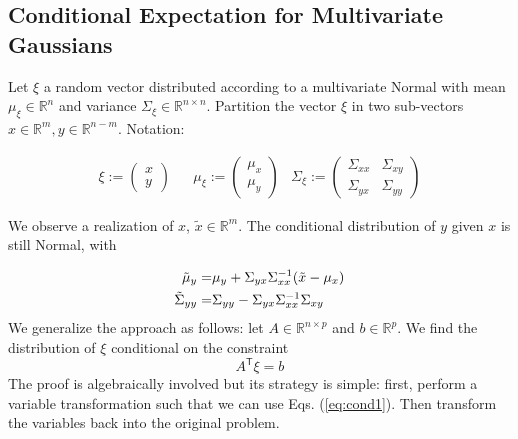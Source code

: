 \documentclass[letter, 12pt]{article}
\newcommand{\transpose}{^\mathsf{T}}
\newcommand{\R}{\mathbb{R}}
\newcommand{\inv}{^{-1}}
\begin{document}



\subsection{Conditional Expectation for Multivariate Gaussians}

Let $\xi$ a random vector distributed according to a multivariate Normal with mean $\mu_\xi\in\R^n$ and variance $\Sigma_\xi \in\R^{n\times n}$. Partition the vector $\xi$ in two sub-vectors $x\in \R^m, y\in\R^{n-m}$. Notation:

\begin{align*}
\xi:=\left(
\begin{array}{c}
x\\
y
\end{array}
\right) & &
\mu_\xi:=\left(
\begin{array}{c}
\mu_x\\
\mu_y
\end{array}
\right)& 
\Sigma_\xi:=\left(
\begin{array}{cc}
\Sigma_{xx} & \Sigma_{xy}\\
\Sigma_{yx} & \Sigma_{yy}
\end{array}
\right)
\end{align*}

We observe a realization of $x$, $\tilde x\in \R^m$. The conditional distribution of $y$ given $x$ is still Normal, with

%

%

\begin{align}
\tilde\mu_y=&\mu_y + \Sigma_{yx} \Sigma_{xx}\inv(\tilde x-\mu_x) \label{eq:cond1} \\
\tilde\Sigma_{yy}=& \Sigma_{yy} - \Sigma_{yx} \Sigma_{xx}\inv \Sigma_{xy} \notag
\end{align}
%
We generalize the approach as follows: let $A\in\R^{n\times p}$ and $b\in\R^p$. We find the distribution of $\xi$ conditional on the constraint
$$A\transpose \xi = b$$
The proof is algebraically involved but its strategy is simple: first, perform a variable transformation such that we can use Eqs. (\ref{eq:cond1}). Then transform the variables back into the original problem.
\end{document}

